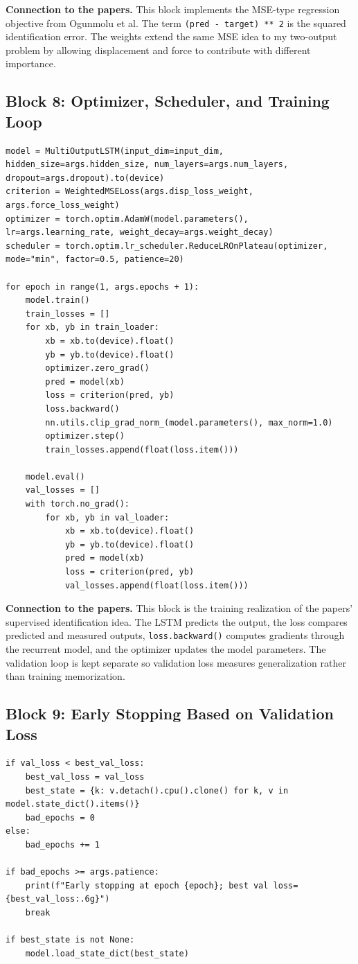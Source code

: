 \documentclass[11pt]{article}
\begin{document}
\noindent\textbf{Connection to the papers.}
This block implements the MSE-type regression objective from Ogunmolu et al. The term \texttt{(pred - target) ** 2} is the squared identification error. The weights extend the same MSE idea to my two-output problem by allowing displacement and force to contribute with different importance.

\subsection{Block 8: Optimizer, Scheduler, and Training Loop}
\begin{lstlisting}[style=pythonstyle]
model = MultiOutputLSTM(input_dim=input_dim, hidden_size=args.hidden_size, num_layers=args.num_layers, dropout=args.dropout).to(device)
criterion = WeightedMSELoss(args.disp_loss_weight, args.force_loss_weight)
optimizer = torch.optim.AdamW(model.parameters(), lr=args.learning_rate, weight_decay=args.weight_decay)
scheduler = torch.optim.lr_scheduler.ReduceLROnPlateau(optimizer, mode="min", factor=0.5, patience=20)

for epoch in range(1, args.epochs + 1):
    model.train()
    train_losses = []
    for xb, yb in train_loader:
        xb = xb.to(device).float()
        yb = yb.to(device).float()
        optimizer.zero_grad()
        pred = model(xb)
        loss = criterion(pred, yb)
        loss.backward()
        nn.utils.clip_grad_norm_(model.parameters(), max_norm=1.0)
        optimizer.step()
        train_losses.append(float(loss.item()))

    model.eval()
    val_losses = []
    with torch.no_grad():
        for xb, yb in val_loader:
            xb = xb.to(device).float()
            yb = yb.to(device).float()
            pred = model(xb)
            loss = criterion(pred, yb)
            val_losses.append(float(loss.item()))
\end{lstlisting}

\noindent\textbf{Connection to the papers.}
This block is the training realization of the papers' supervised identification idea. The LSTM predicts the output, the loss compares predicted and measured outputs, \texttt{loss.backward()} computes gradients through the recurrent model, and the optimizer updates the model parameters. The validation loop is kept separate so validation loss measures generalization rather than training memorization.

\subsection{Block 9: Early Stopping Based on Validation Loss}
\begin{lstlisting}[style=pythonstyle]
if val_loss < best_val_loss:
    best_val_loss = val_loss
    best_state = {k: v.detach().cpu().clone() for k, v in model.state_dict().items()}
    bad_epochs = 0
else:
    bad_epochs += 1

if bad_epochs >= args.patience:
    print(f"Early stopping at epoch {epoch}; best val loss={best_val_loss:.6g}")
    break

if best_state is not None:
    model.load_state_dict(best_state)
\end{lstlisting}
\end{document}
